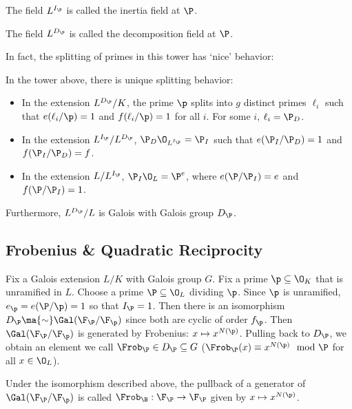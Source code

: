 \begin{dfn}
The field $L^{I_\P}$ is called the inertia field at $\P$.
\end{dfn}

\begin{dfn}
The field $L^{D_\P}$ is called the decomposition field at $\P$.
\end{dfn}

In fact, the splitting of primes in this tower has `nice' behavior:

\begin{prop}
In the tower above, there is unique splitting behavior:
\begin{itemize}
\item In the extension $L^{D_\P}/K$, the prime $\p$ splits into $g$ distinct primes $\ell_i$ such that $e(\ell_i/\p)=1$ and $f(\ell_i/\p)=1$ for all $i$. For some $i$, $\ell_i= \P_D$.
\item In the extension $L^{I_\P}/L^{D_\P}$, $\P_D \O_{L^{I_\P}}= \P_I$ such that $e(\P_I/\P_D)=1$ and $f(\P_I/\P_D)=f$.
\item In the extension $L/L^{I_\P}$, $\P_I\O_L=\P^e$, where $e(\P/\P_I)=e$ and $f(\P/\P_I)=1$.
\end{itemize}
Furthermore, $L^{D_\P}/L$ is Galois with Galois group $D_\P$. 
\end{prop}




\subsection{Frobenius \& Quadratic Reciprocity}


Fix a Galois extension $L/K$ with Galois group $G$. Fix a prime $\p \subseteq \O_K$ that is unramified in $L$. Choose a prime $\P \subseteq \O_L$ dividing $\p$. Since $\p$ is unramified, $e_\p=e(\P/\p)=1$ so that $I_\P=1$. Then there is an isomorphism $D_\P \ma{\sim} \Gal(\F_\P/\F_\p)$ since both are cyclic of order $f_\p$. Then $\Gal(\F_\P/\F_\p)$ is generated by Frobenius: $x \mapsto x^{N(\p)}$. Pulling back to $D_\P$, we obtain an element we call $\Frob_\P \in D_\P \subseteq G$ ($\Frob_\P(x) \equiv x^{N(\p)} \mod \P$ for all $x \in \O_L$). 

\begin{dfn}[Frobenius]
Under the isomorphism described above, the pullback of a generator of $\Gal(\F_\P/\F_\p)$ is called $\Frob_\B: \F_\P \to \F_\P$ given by $x \mapsto x^{N(\p)}$. 
\end{dfn}

